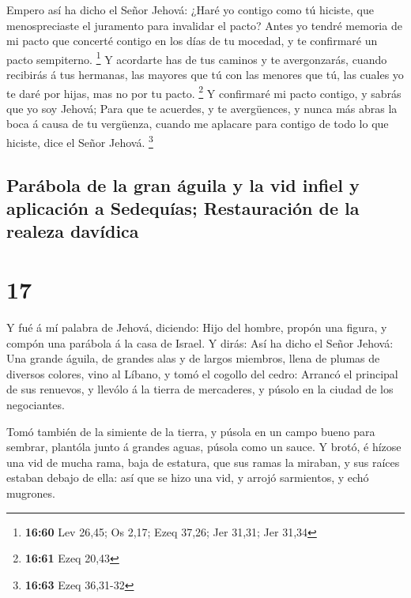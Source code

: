  Empero así ha dicho el Señor Jehová: ¿Haré yo contigo
como tú hiciste, que menospreciaste el juramento para invalidar el
pacto?  Antes yo tendré memoria de mi pacto que concerté
contigo en los días de tu mocedad, y te confirmaré un pacto sempiterno.
\footnote{\textbf{16:60} Lev 26,45; Os 2,17; Ezeq 37,26; Jer 31,31; Jer
  31,34}  Y acordarte has de tus caminos y te
avergonzarás, cuando recibirás á tus hermanas, las mayores que tú con
las menores que tú, las cuales yo te daré por hijas, mas no por tu
pacto. \footnote{\textbf{16:61} Ezeq 20,43}  Y confirmaré
mi pacto contigo, y sabrás que yo soy Jehová;  Para que
te acuerdes, y te avergüences, y nunca más abras la boca á causa de tu
vergüenza, cuando me aplacare para contigo de todo lo que hiciste, dice
el Señor Jehová. \footnote{\textbf{16:63} Ezeq 36,31-32}

\hypertarget{paruxe1bola-de-la-gran-uxe1guila-y-la-vid-infiel-y-aplicaciuxf3n-a-sedequuxedas-restauraciuxf3n-de-la-realeza-davuxeddica}{%
\subsection{Parábola de la gran águila y la vid infiel y aplicación a
Sedequías; Restauración de la realeza
davídica}\label{paruxe1bola-de-la-gran-uxe1guila-y-la-vid-infiel-y-aplicaciuxf3n-a-sedequuxedas-restauraciuxf3n-de-la-realeza-davuxeddica}}

\hypertarget{section-16}{%
\section{17}\label{section-16}}

 Y fué á mí palabra de Jehová, diciendo: 
Hijo del hombre, propón una figura, y compón una parábola á la casa de
Israel.  Y dirás: Así ha dicho el Señor Jehová: Una grande
águila, de grandes alas y de largos miembros, llena de plumas de
diversos colores, vino al Líbano, y tomó el cogollo del cedro:
 Arrancó el principal de sus renuevos, y llevólo á la
tierra de mercaderes, y púsolo en la ciudad de los negociantes.

 Tomó también de la simiente de la tierra, y púsola en un
campo bueno para sembrar, plantóla junto á grandes aguas, púsola como un
sauce.  Y brotó, é hízose una vid de mucha rama, baja de
estatura, que sus ramas la miraban, y sus raíces estaban debajo de ella:
así que se hizo una vid, y arrojó sarmientos, y echó mugrones.

